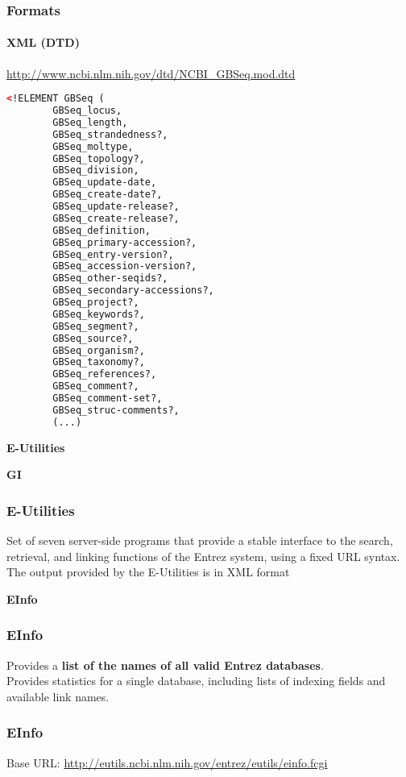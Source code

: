 \documentclass{beamer}
\newcommand{\centeredtitle}[1]{
\begin{center}
    \Huge{\bf{#1}}
\end{center}
}
\newcommand{\hugeslide}[1]{
\begin{frame}
\centeredtitle{#1}
\end{frame}
}
\begin{document}
\begin{frame}[fragile]
\frametitle{Formats}
\framesubtitle{XML (DTD)}
\url{http://www.ncbi.nlm.nih.gov/dtd/NCBI_GBSeq.mod.dtd}
\begin{lstlisting}[language=xml,basicstyle=\tiny,breaklines=false]
<!ELEMENT GBSeq (
        GBSeq_locus, 
        GBSeq_length, 
        GBSeq_strandedness?, 
        GBSeq_moltype, 
        GBSeq_topology?, 
        GBSeq_division, 
        GBSeq_update-date, 
        GBSeq_create-date?, 
        GBSeq_update-release?, 
        GBSeq_create-release?, 
        GBSeq_definition, 
        GBSeq_primary-accession?, 
        GBSeq_entry-version?, 
        GBSeq_accession-version?, 
        GBSeq_other-seqids?, 
        GBSeq_secondary-accessions?, 
        GBSeq_project?, 
        GBSeq_keywords?, 
        GBSeq_segment?, 
        GBSeq_source?, 
        GBSeq_organism?, 
        GBSeq_taxonomy?, 
        GBSeq_references?, 
        GBSeq_comment?, 
        GBSeq_comment-set?, 
        GBSeq_struc-comments?, 
        (...)
\end{lstlisting}
\end{frame}


\hugeslide{E-Utilities}

\hugeslide{GI}


\begin{frame}
\frametitle{E-Utilities}
\begin{center}
Set of seven server-side programs that provide a stable interface to the search, retrieval, and linking functions of the Entrez system, using a fixed URL syntax.\\
The output provided by the E-Utilities is in XML format\\
\end{center}
\end{frame}


\hugeslide{EInfo}

\begin{frame}[fragile]
\frametitle{EInfo}
\begin{center}
Provides a {\bf list of the names of all valid Entrez databases}.\\
Provides statistics for a single database, including lists of indexing fields and available link names.
\end{center}
\end{frame}

\begin{frame}[fragile]
\frametitle{EInfo}
Base URL:
\small
\url{http://eutils.ncbi.nlm.nih.gov/entrez/eutils/einfo.fcgi}
\end{frame}
\end{document}
